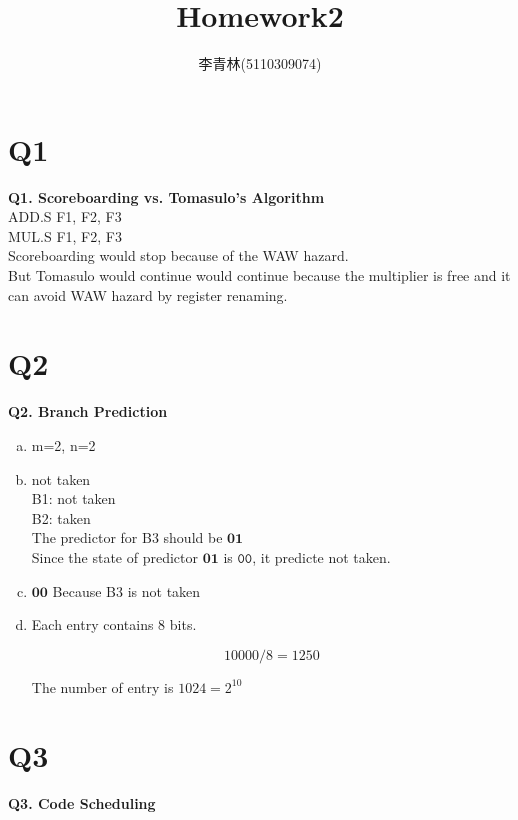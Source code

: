 \documentclass[12pt]{article}
\begin{document}
\begin{CJK*}{UTF8}{gbsn}
\title{Homework2}
\author{李青林(5110309074)}
\date{}
\maketitle

\section{Q1}
\textbf{Q1. Scoreboarding vs. Tomasulo’s Algorithm}\\

ADD.S F1, F2, F3\\
MUL.S F1, F2, F3\\

Scoreboarding would stop because of the WAW hazard.\\
But Tomasulo would continue would continue because the multiplier is free and it can avoid WAW hazard by register renaming.

\section{Q2}
\textbf{Q2. Branch Prediction}

\begin{enumerate}[a)]

\item 
m=2, n=2

\item
not taken\\

B1: not taken\\
B2: taken\\

The predictor for B3 should be $\mathbf{01}$\\
Since the state of predictor $\mathbf{01}$ is $\mathtt{00}$, it predicte not taken.

\item
$\mathbf{00}$
Because B3 is not taken

\item
Each entry contains $8$ bits.

$$10000/8=1250$$

The number of entry is $1024 = 2^{10}$
	
\end{enumerate}

\section{Q3}
\textbf{Q3. Code Scheduling}


\end{CJK*}
\end{document}
